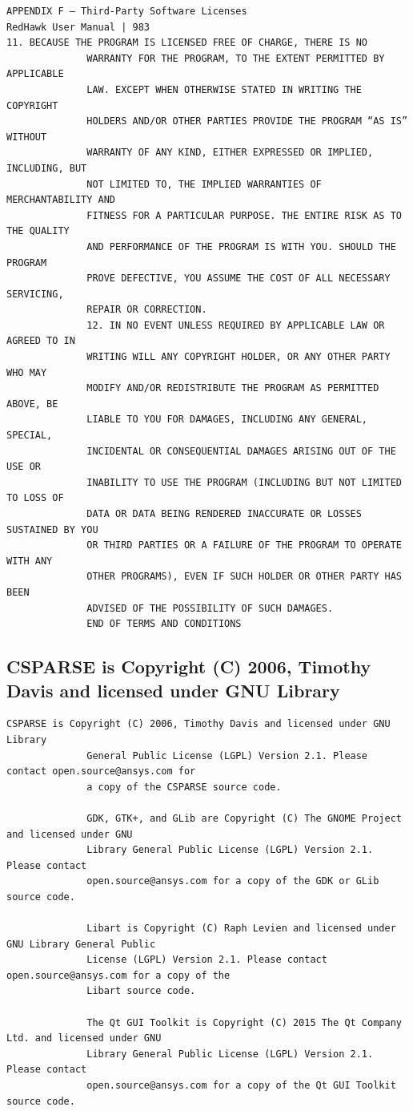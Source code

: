 \begin{lstlisting}[basicstyle=\ttfamily\scriptsize,breaklines=true]
APPENDIX F — Third-Party Software Licenses                                    RedHawk User Manual | 983
11. BECAUSE THE PROGRAM IS LICENSED FREE OF CHARGE, THERE IS NO
              WARRANTY FOR THE PROGRAM, TO THE EXTENT PERMITTED BY APPLICABLE
              LAW. EXCEPT WHEN OTHERWISE STATED IN WRITING THE COPYRIGHT
              HOLDERS AND/OR OTHER PARTIES PROVIDE THE PROGRAM “AS IS” WITHOUT
              WARRANTY OF ANY KIND, EITHER EXPRESSED OR IMPLIED, INCLUDING, BUT
              NOT LIMITED TO, THE IMPLIED WARRANTIES OF MERCHANTABILITY AND
              FITNESS FOR A PARTICULAR PURPOSE. THE ENTIRE RISK AS TO THE QUALITY
              AND PERFORMANCE OF THE PROGRAM IS WITH YOU. SHOULD THE PROGRAM
              PROVE DEFECTIVE, YOU ASSUME THE COST OF ALL NECESSARY SERVICING,
              REPAIR OR CORRECTION.
              12. IN NO EVENT UNLESS REQUIRED BY APPLICABLE LAW OR AGREED TO IN
              WRITING WILL ANY COPYRIGHT HOLDER, OR ANY OTHER PARTY WHO MAY
              MODIFY AND/OR REDISTRIBUTE THE PROGRAM AS PERMITTED ABOVE, BE
              LIABLE TO YOU FOR DAMAGES, INCLUDING ANY GENERAL, SPECIAL,
              INCIDENTAL OR CONSEQUENTIAL DAMAGES ARISING OUT OF THE USE OR
              INABILITY TO USE THE PROGRAM (INCLUDING BUT NOT LIMITED TO LOSS OF
              DATA OR DATA BEING RENDERED INACCURATE OR LOSSES SUSTAINED BY YOU
              OR THIRD PARTIES OR A FAILURE OF THE PROGRAM TO OPERATE WITH ANY
              OTHER PROGRAMS), EVEN IF SUCH HOLDER OR OTHER PARTY HAS BEEN
              ADVISED OF THE POSSIBILITY OF SUCH DAMAGES.
              END OF TERMS AND CONDITIONS
\end{lstlisting}

\subsection{CSPARSE is Copyright (C) 2006, Timothy Davis and licensed under GNU Library}

\begin{lstlisting}[basicstyle=\ttfamily\scriptsize,breaklines=true]
CSPARSE is Copyright (C) 2006, Timothy Davis and licensed under GNU Library
              General Public License (LGPL) Version 2.1. Please contact open.source@ansys.com for
              a copy of the CSPARSE source code.

              GDK, GTK+, and GLib are Copyright (C) The GNOME Project and licensed under GNU
              Library General Public License (LGPL) Version 2.1. Please contact
              open.source@ansys.com for a copy of the GDK or GLib source code.

              Libart is Copyright (C) Raph Levien and licensed under GNU Library General Public
              License (LGPL) Version 2.1. Please contact open.source@ansys.com for a copy of the
              Libart source code.

              The Qt GUI Toolkit is Copyright (C) 2015 The Qt Company Ltd. and licensed under GNU
              Library General Public License (LGPL) Version 2.1. Please contact
              open.source@ansys.com for a copy of the Qt GUI Toolkit source code.
\end{lstlisting}

